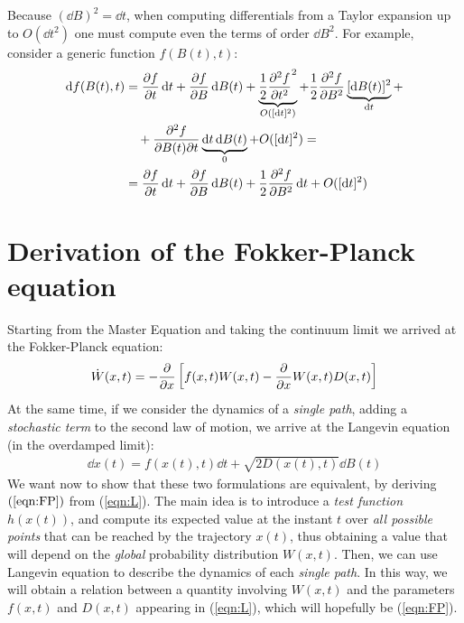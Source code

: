 \documentclass[../template.tex]{subfiles}
\begin{document}
\begin{example}
    Because $(\dd{B})^2 = \dd{t}$, when computing differentials from a Taylor expansion up to $O(\dd{t}^2)$ one must compute even the terms of order $\dd{B}^2$. For example, consider a generic function $f(B(t), t)$:
    \begin{align*}
        \dd{f(B(t),t)} &= \pdv{f}{t} \dd{t} + \pdv{f}{B} \dd{B(t)} + \underbrace{\frac{1}{2} \pdv[2]{f}{t} (\dd{t})^2}_{O([\dd{t}]^2)}  + \frac{1}{2} \pdv[2]{f}{B} \underbrace{[\dd{B(t)}]^2}_{\dd{t}}  +\\
        &\quad + \pdv[2]{f}{B(t)}{t} \underbrace{\dd{t} \dd{B(t)}}_{0}  + O([\dd{t}]^2)   =\\
        &= \pdv{f}{t}\dd{t} + \pdv{f}{B}\dd{B(t)}+ \frac{1}{2} \pdv[2]{f}{B} \dd{t} +  O([\dd{t}]^2)
    \end{align*}
\end{example}

\section{Derivation of the Fokker-Planck equation}
Starting from the Master Equation and taking the continuum limit we arrived at the Fokker-Planck equation:
\begin{align}
    \dot{W}(x,t) = -\pdv{x}\left[f(x,t) W(x,t) - \pdv{x}W(x,t) D(x,t)\right] \label{eqn:FP}
\end{align}
At the same time, if we consider the dynamics of a \textit{single path}, adding a \textit{stochastic term} to the second law of motion, we arrive at the Langevin equation (in the overdamped limit): 
\begin{align}
    \dd{x(t)} = f(x(t),t)\dd{t} + \sqrt{2D(x(t),t)} \dd{B(t)} \label{eqn:L}
\end{align}
We want now to show that these two formulations are equivalent, by deriving $(\ref{eqn:FP})$ from (\ref{eqn:L}). The main idea is to introduce a \textit{test function} $h(x(t))$, and compute its expected value at the instant $t$ over \textit{all possible points} that can be reached by the trajectory $x(t)$, thus obtaining a value that will depend on the \textit{global} probability distribution $W(x,t)$. Then, we can use Langevin equation to describe the dynamics of each \textit{single path}. In this way, we will obtain a relation between a quantity involving $W(x,t)$ and the parameters $f(x,t)$ and $D(x,t)$ appearing in (\ref{eqn:L}), which will hopefully be (\ref{eqn:FP}). 
\end{document}
